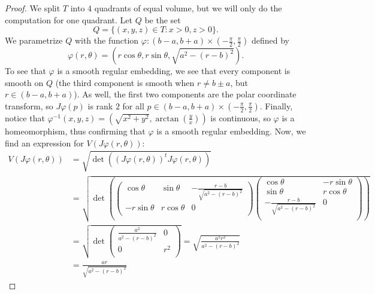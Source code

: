 \documentclass{article}
\theoremstyle{plain} %
\numberwithin{thm}{section} %
\theoremstyle{definition}
\begin{document}
\begin{proof}
        We split \(T\) into \(4\) quadrants of equal volume, but we will only do the computation for one quadrant. Let \(Q\) be the set
        \[
            Q = \{ (x,y,z) \in T : x > 0 , z > 0 \}.
        \]
        We parametrize \(Q\) with the function \(\varphi : (b -a, b + a) \times \left( -\frac{\pi}{2},\frac{\pi}{2} \right)\) defined by
        \[
            \varphi (r,\theta) = (r\cos \theta , r\sin \theta , \sqrt{a^2 - (r - b)^2}).
        \]
        To see that \(\varphi\) is a smooth regular embedding, we see that every component is smooth on \(Q\) (the third component is smooth when \(r \neq b \pm a\), but \(r \in (b - a, b + a)\)). As well, the first two components are the polar coordinate transform, so \(J \varphi(p)\) is rank \(2\) for all \(p \in (b - a, b + a)\times \left( -\frac{\pi}{2}, \frac{\pi}{2} \right)\). Finally, notice that \(\varphi^{-1}(x,y,z) = \left( \sqrt{x^2 + y^2} , \arctan \left( \frac{y}{x} \right)  \right) \) is continuous, so \(\varphi\) is a homeomorphism, thus confirming that \(\varphi\) is a smooth regular embedding. Now, we find an expression for \(V(J \varphi(r, \theta))\):
        \begin{align*}
            V(J \varphi(r, \theta)) &= \sqrt{\det ((J \varphi (r, \theta))^t J \varphi (r, \theta))} \\
            &= \sqrt{\det \left(\begin{pmatrix}
                \cos \theta  & \sin \theta & - \frac{r - b}{\sqrt{a^2 - (r-b)^2}} \\
                -r \sin \theta & r\cos \theta & 0  \\
            \end{pmatrix}
            \begin{pmatrix}
                \cos \theta & -r \sin \theta  \\
                \sin \theta & r\cos \theta  \\
                - \frac{r-b}{\sqrt{a^2 - (r - b)^2}}& 0  \\
            \end{pmatrix}
            \right)} \\
            &= \sqrt{\det \begin{pmatrix}
                \frac{a^2}{a^2 - (r-b)^2} & 0  \\
                0 & r^2  \\
            \end{pmatrix}}
            = \sqrt{\frac{a^2 r^2}{a^2 - (r - b)^2}} \\
            &= \frac{ar}{\sqrt{a^2 - (r - b)^2}}

\end{align*}
\end{proof}
\end{document}
